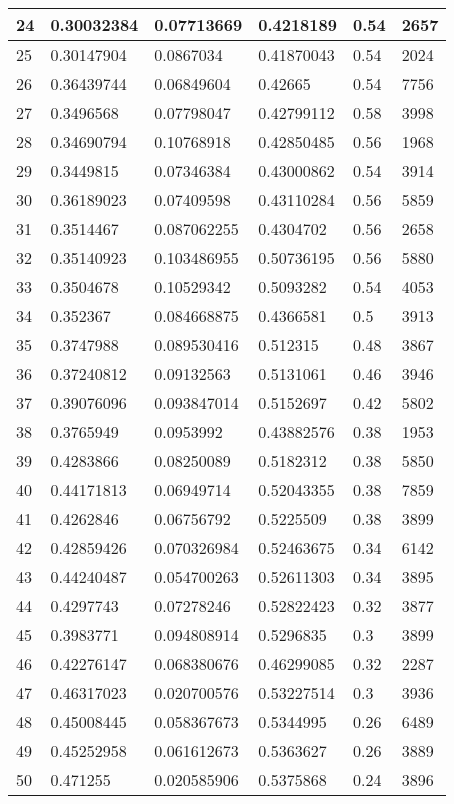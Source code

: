 \begin{longtable}{|l|l|l|l|l|l|}
24 & 0.30032384 & 0.07713669 & 0.4218189 & 0.54 & 2657 \\ \hline 
25 & 0.30147904 & 0.0867034 & 0.41870043 & 0.54 & 2024 \\ \hline 
26 & 0.36439744 & 0.06849604 & 0.42665 & 0.54 & 7756 \\ \hline 
27 & 0.3496568 & 0.07798047 & 0.42799112 & 0.58 & 3998 \\ \hline 
28 & 0.34690794 & 0.10768918 & 0.42850485 & 0.56 & 1968 \\ \hline 
29 & 0.3449815 & 0.07346384 & 0.43000862 & 0.54 & 3914 \\ \hline 
30 & 0.36189023 & 0.07409598 & 0.43110284 & 0.56 & 5859 \\ \hline 
31 & 0.3514467 & 0.087062255 & 0.4304702 & 0.56 & 2658 \\ \hline 
32 & 0.35140923 & 0.103486955 & 0.50736195 & 0.56 & 5880 \\ \hline 
33 & 0.3504678 & 0.10529342 & 0.5093282 & 0.54 & 4053 \\ \hline 
34 & 0.352367 & 0.084668875 & 0.4366581 & 0.5 & 3913 \\ \hline 
35 & 0.3747988 & 0.089530416 & 0.512315 & 0.48 & 3867 \\ \hline 
36 & 0.37240812 & 0.09132563 & 0.5131061 & 0.46 & 3946 \\ \hline 
37 & 0.39076096 & 0.093847014 & 0.5152697 & 0.42 & 5802 \\ \hline 
38 & 0.3765949 & 0.0953992 & 0.43882576 & 0.38 & 1953 \\ \hline 
39 & 0.4283866 & 0.08250089 & 0.5182312 & 0.38 & 5850 \\ \hline 
40 & 0.44171813 & 0.06949714 & 0.52043355 & 0.38 & 7859 \\ \hline 
41 & 0.4262846 & 0.06756792 & 0.5225509 & 0.38 & 3899 \\ \hline 
42 & 0.42859426 & 0.070326984 & 0.52463675 & 0.34 & 6142 \\ \hline 
43 & 0.44240487 & 0.054700263 & 0.52611303 & 0.34 & 3895 \\ \hline 
44 & 0.4297743 & 0.07278246 & 0.52822423 & 0.32 & 3877 \\ \hline 
45 & 0.3983771 & 0.094808914 & 0.5296835 & 0.3 & 3899 \\ \hline 
46 & 0.42276147 & 0.068380676 & 0.46299085 & 0.32 & 2287 \\ \hline 
47 & 0.46317023 & 0.020700576 & 0.53227514 & 0.3 & 3936 \\ \hline 
48 & 0.45008445 & 0.058367673 & 0.5344995 & 0.26 & 6489 \\ \hline 
49 & 0.45252958 & 0.061612673 & 0.5363627 & 0.26 & 3889 \\ \hline 
50 & 0.471255 & 0.020585906 & 0.5375868 & 0.24 & 3896 \\ \hline 
\end{longtable}